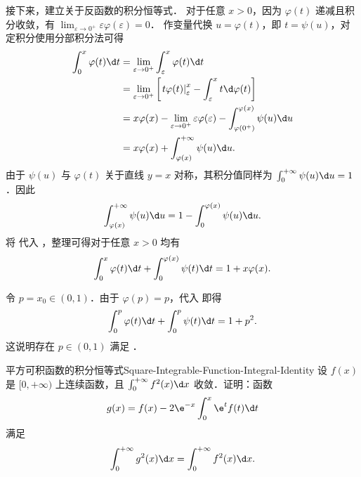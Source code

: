 \begin{myproof}
    接下来，建立关于反函数的积分恒等式．
    对于任意 $x > 0$，因为 $\varphi(t)$ 递减且积分收敛，有 $\lim_{\varepsilon\to0^+} \varepsilon\varphi(\varepsilon) = 0$．
    作变量代换 $u = \varphi(t)$，即 $t = \psi(u)$，对定积分使用分部积分法可得
    \begin{equation}\label{eq:q14-by-parts-6}
        \begin{aligned}
            \int_0^x \varphi(t) \d t
             & = \lim_{\varepsilon\to0^+} \int_{\varepsilon}^x \varphi(t) \d t                                                             \\
             & = \lim_{\varepsilon\to0^+} \left[ \left. t \varphi(t) \right|_{\varepsilon}^x - \int_{\varepsilon}^x t \d\varphi(t) \right] \\
             & = x \varphi(x) - \lim_{\varepsilon\to0^+} \varepsilon\varphi(\varepsilon) - \int_{\varphi(0^+)}^{\varphi(x)} \psi(u) \d u   \\
             & = x \varphi(x) + \int_{\varphi(x)}^{+\infty} \psi(u) \d u.
        \end{aligned}
    \end{equation}
    由于 $\psi(u)$ 与 $\varphi(t)$ 关于直线 $y=x$ 对称，其积分值同样为 $\int_0^{+\infty} \psi(u) \d u = 1$．因此
    \begin{equation}\label{eq:q14-psi-tail-7}
        \int_{\varphi(x)}^{+\infty} \psi(u) \d u = 1 - \int_0^{\varphi(x)} \psi(u) \d u.
    \end{equation}
    将  代入 ，整理可得对于任意 $x > 0$ 均有
    \begin{equation}\label{eq:q14-identity-8}
        \int_0^x \varphi(t) \d t + \int_0^{\varphi(x)} \psi(t) \d t = 1 + x \varphi(x).
    \end{equation}

    令 $p = x_0 \in (0, 1)$．由于 $\varphi(p) = p$，代入  即得
    \begin{equation}\label{eq:q14-final-9}
        \int_0^p \varphi(t) \d t + \int_0^p \psi(t) \d t = 1 + p^2.
    \end{equation}
    这说明存在 $p \in (0, 1)$ 满足 ．
\end{myproof}

\begin{problem}{平方可积函数的积分恒等式}{Square-Integrable-Function-Integral-Identity}
    设 $f(x)$ 是 $[0,+\infty)$ 上连续函数，且 $\int_0^{+\infty} f^2(x) \d x$ 收敛．证明：函数
    \begin{equation}\label{eq:q15-g-def-1}
        g(x) = f(x) - 2\e^{-x} \int_0^x \e^t f(t) \d t
    \end{equation}
    满足
    \begin{equation}\label{eq:q15-target-2}
        \int_0^{+\infty} g^2(x) \d x = \int_0^{+\infty} f^2(x) \d x.
    \end{equation}
\end{problem}

